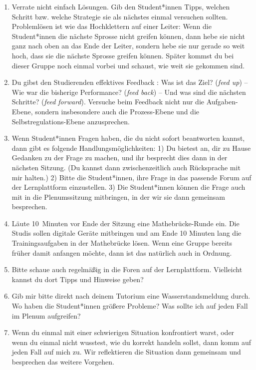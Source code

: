\documentclass{../cssheet}
\begin{document}
\begin{enumerate}
\item Verrate nicht einfach Lösungen. Gib den Student*innen Tipps, welchen Schritt bzw. welche Strategie sie als nächstes einmal versuchen sollten. Problemlösen ist wie das Hochklettern auf einer Leiter: Wenn die Student*innen die nächste Sprosse nicht greifen können, dann hebe sie nicht ganz nach oben an das Ende der Leiter, sondern hebe sie nur gerade so weit hoch, dass sie die nächste Sprosse greifen können. Später kommst du bei dieser Gruppe noch einmal vorbei und schaust, wie weit sie gekommen sind.
\item Du gibst den Studierenden effektives Feedback \parencite{hattie2007}: Was ist das Ziel? (\emph{feed up}) -- Wie war die bisherige Performance? (\emph{feed back}) -- Und was sind die nächsten Schritte? (\emph{feed forward}). Versuche beim Feedback nicht nur die Aufgaben-Ebene, sondern insbesondere auch die Prozess-Ebene und die Selbst\-re\-gu\-la\-tions-Ebene anzusprechen.
\item Wenn Student*innen Fragen haben, die du nicht sofort beantworten kannst, dann gibt es folgende Handlungsmöglichkeiten: 1) Du bietest an, dir zu Hause Gedanken zu der Frage zu machen, und ihr besprecht dies dann in der nächsten Sitzung. (Du kannst dann zwischenzeitlich auch Rücksprache mit mir halten.) 2) Bitte die Student*innen, ihre Frage in das passende Forum auf der Lernplattform einzustellen. 3) Die Student*innen können die Frage auch mit in die Plenumssitzung mitbringen, in der wir sie dann gemeinsam besprechen.
\item Läute 10~Minuten vor Ende der Sitzung eine Mathebrücke-Runde ein. Die Studis sollen digitale Geräte mitbringen und am Ende 10 Minuten lang die Trainingsaufgaben in der Mathebrücke lösen. Wenn eine Gruppe bereits früher damit anfangen möchte, dann ist das natürlich auch in Ordnung.
\item Bitte schaue auch regelmäßig in die Foren auf der Lernplattform. Vielleicht kannst du dort Tipps und Hinweise geben?
\item Gib mir bitte direkt nach deinem Tutorium eine \glqq{}Wasserstandsmeldung\grqq{} durch. Wo haben die Student*innen größere Probleme? Was sollte ich auf jeden Fall im Plenum aufgreifen?
\item Wenn du einmal mit einer schwierigen Situation konfrontiert warst, oder wenn du einmal nicht wusstest, wie du korrekt handeln sollst, dann komm auf jeden Fall auf mich zu. Wir reflektieren die Situation dann gemeinsam und besprechen das weitere Vorgehen.
\end{enumerate}
\pagestyle{docstyle}


\printbibliography[title=Literatur]

\vspace*{10mm}

\printlicense

\printsocials
\end{document}
